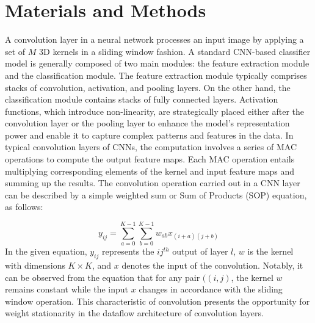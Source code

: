 \documentclass[conference]{IEEEtran}
\begin{document}
\section{Materials and Methods } \label{sec: proposed}
A convolution layer in a neural network processes an input image by applying a set of $M$ 3D kernels in a sliding window fashion. A standard CNN-based classifier model is generally composed of two main modules: the feature extraction module and the classification module. The feature extraction module typically comprises stacks of convolution, activation, and pooling layers. On the other hand, the classification module contains stacks of fully connected layers. Activation functions, which introduce non-linearity, are strategically placed either after the convolution layer or the pooling layer to enhance the model's representation power and enable it to capture complex patterns and features in the data. In typical convolution layers of CNNs, the computation involves a series of MAC operations to compute the output feature maps. Each MAC operation entails multiplying corresponding elements of the kernel and input feature maps and summing up the results. The convolution operation carried out in a CNN layer can be described by a simple weighted sum or Sum of Products (SOP) equation, as follows:

\begin{equation} \label{eq:conv}
    y_{ij} = \sum_{a=0}^{K-1} \sum_{b=0}^{K-1} w_{ab} x_{(i+a)(j+b)}
\end{equation}
In the given equation, $y_{ij}$ represents the $ij^{th}$ output of layer $l$, $w$ is the kernel with dimensions $K \times K$, and $x$ denotes the input of the convolution. Notably, it can be observed from the equation that for any pair $((i, j)$, the kernel $w$ remains constant while the input $x$ changes in accordance with the sliding window operation. This characteristic of convolution presents the opportunity for weight stationarity in the dataflow architecture of convolution layers.
\end{document}
